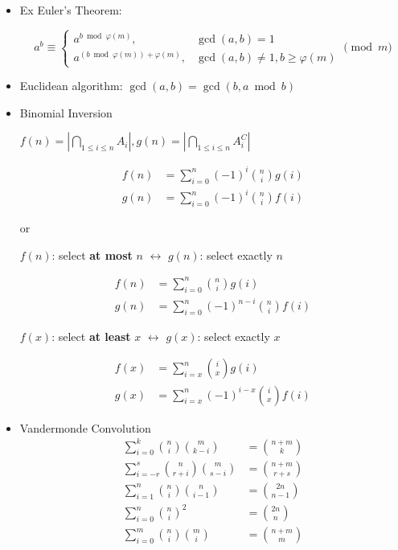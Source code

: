 \begin{itemize}
	\item Ex Euler's Theorem:

	      $$
	      a^b\equiv
	      \begin{cases}
	      	a^{b\bmod {\varphi(m)}} ,                        & \gcd(a, b) = 1                      \\
	      	a^{\left(b\bmod {\varphi(m)}\right)+\varphi(m)}, & \gcd(a, b) \neq 1,b \geq \varphi(m)
	      \end{cases} \pmod m
	      $$

	\item Euclidean algorithm: $\gcd(a, b) = \gcd(b, a\bmod b)$

	\item Binomial Inversion

	      $f(n) = |\bigcap_{1\leq i \leq n} A_i|, g(n) = |\bigcap_{1\leq i \leq n} A_i^C|$

	      $$
	      \begin{aligned}
	      	f(n) & =\sum_{i=0}^n(-1)^i\binom{n}{i}g(i)     \\
	      	g(n) & =\sum_{i=0}^n(-1)^i\binom{n}{i}f(i)
	      \end{aligned}
	      $$

		  or

		  $f(n)$: select \textbf{at most} $n$ $\leftrightarrow$  $g(n)$: select exactly $n$

		  $$
		  \begin{aligned}
	      	f(n) & =\sum_{i=0}^n\binom{n}{i}g(i)           \\
	      	g(n) & =\sum_{i=0}^n(-1)^{n-i}\binom{n}{i}f(i)
	      \end{aligned}
		  $$

	      $f(x)$: select \textbf{at least} $x$ $\leftrightarrow$  $g(x)$: select exactly $x$

	      $$
	      \begin{aligned}
	      	f(x) & =\sum_{i=x}^n\binom{i}{x}g(i)           \\
	      	g(x) & =\sum_{i=x}^n(-1)^{i-x}\binom{i}{x}f(i)
	      \end{aligned}
	      $$

	\item Vandermonde Convolution
		  $$
		  \begin{aligned}
			\sum_{i=0}^k \binom{n}{i}\binom{m}{k - i} &= \binom{n + m}{k} \\
			\sum_{i=-r}^s \binom{n}{r + i}\binom{m}{s - i} &= \binom{n + m}{r + s} \\
			\sum_{i=1}^n \binom{n}{i}\binom{n}{i - 1} &= \binom{2n}{n - 1} \\
			\sum_{i=0}^n \binom{n}{i} ^2 &= \binom{2n}{n} \\
			\sum_{i=0}^m \binom{n}{i}\binom{m}{i} &= \binom{n + m}{m}
		  \end{aligned}
		  $$

\end{itemize}
